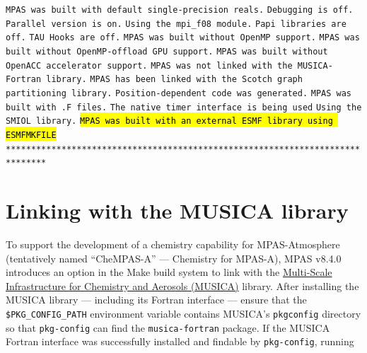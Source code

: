 {\vspace{12pt}
\noindent {\tt *******************************************************************************} \newline
{\tt MPAS was built with default single-precision reals.} \newline
{\tt Debugging is off.} \newline
{\tt Parallel version is on.} \newline
{\tt Using the mpi\_f08 module.} \newline
{\tt Papi libraries are off.} \newline
{\tt TAU Hooks are off.} \newline
{\tt MPAS was built without OpenMP support.} \newline
{\tt MPAS was built without OpenMP-offload GPU support.} \newline
{\tt MPAS was built without OpenACC accelerator support.} \newline
{\tt MPAS was not linked with the MUSICA-Fortran library.} \newline
{\tt MPAS has been linked with the Scotch graph partitioning library.} \newline
{\tt Position-dependent code was generated.} \newline
{\tt MPAS was built with .F files.} \newline
{\tt The native timer interface is being used} \newline
{\tt Using the SMIOL library.} \newline
{\tt \hl{MPAS was built with an external ESMF library using ESMFMKFILE}} \newline
{\tt *******************************************************************************}
\vspace{12pt}


\section{Linking with the MUSICA library}
\label{sec:build_musica}

To support the development of a chemistry capability for MPAS-Atmosphere (tentatively named ``CheMPAS-A'' --- Chemistry for MPAS-A), MPAS v8.4.0 introduces an option in the Make build system to link with the \href{https://github.com/NCAR/musica}{Multi-Scale Infrastructure for Chemistry and Aerosols (MUSICA)} library.
After installing the MUSICA library --- including its Fortran interface --- ensure that the {\tt \$PKG\_CONFIG\_PATH} environment variable contains MUSICA's {\tt pkgconfig} directory so that {\tt pkg-config} can find the {\tt musica-fortran} package. If the MUSICA Fortran interface was successfully installed and findable by {\tt pkg-config}, running

}
